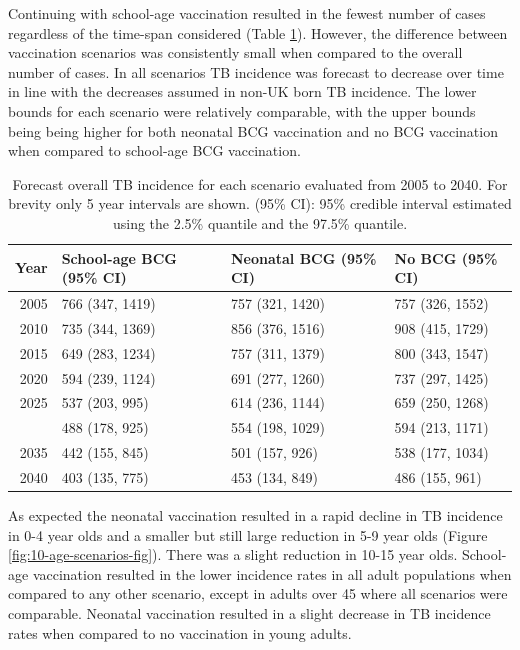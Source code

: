\documentclass[11pt,twoside]{bristolthesis}
\begin{document}
  Continuing with school-age vaccination resulted in the fewest number of cases regardless of the time-span considered (Table \ref{tab:10-table-future-incidence}). However, the difference between vaccination scenarios was consistently small when compared to the overall number of cases. In all scenarios TB incidence was forecast to decrease over time in line with the decreases assumed in non-UK born TB incidence. The lower bounds for each scenario were relatively comparable, with the upper bounds being being higher for both neonatal BCG vaccination and no BCG vaccination when compared to school-age BCG vaccination.
  \begin{longtable}{rlll}
  \caption[Forecast overall TB incidence for each scenario evaluated from 2005 to 2040.]{\label{tab:10-table-future-incidence}Forecast overall TB incidence for each scenario evaluated from 2005 to 2040. For brevity only 5 year intervals are shown. (95\% CI): 95\% credible interval estimated using the 2.5\% quantile and the 97.5\% quantile.}\\
  \toprule
  Year & School-age BCG (95\% CI) & Neonatal BCG (95\% CI) & No BCG (95\% CI)\\
  \midrule
  2005 & 766 (347, 1419) & 757 (321, 1420) & 757 (326, 1552)\\
  2010 & 735 (344, 1369) & 856 (376, 1516) & 908 (415, 1729)\\
  2015 & 649 (283, 1234) & 757 (311, 1379) & 800 (343, 1547)\\
  2020 & 594 (239, 1124) & 691 (277, 1260) & 737 (297, 1425)\\
  2025 & 537 (203, 995) & 614 (236, 1144) & 659 (250, 1268)\\
  \addlinespace
  2030 & 488 (178, 925) & 554 (198, 1029) & 594 (213, 1171)\\
  2035 & 442 (155, 845) & 501 (157, 926) & 538 (177, 1034)\\
  2040 & 403 (135, 775) & 453 (134, 849) & 486 (155, 961)\\
  \bottomrule
  \end{longtable}
  As expected the neonatal vaccination resulted in a rapid decline in TB incidence in 0-4 year olds and a smaller but still large reduction in 5-9 year olds (Figure \ref{fig:10-age-scenarios-fig}). There was a slight reduction in 10-15 year olds. School-age vaccination resulted in the lower incidence rates in all adult populations when compared to any other scenario, except in adults over 45 where all scenarios were comparable. Neonatal vaccination resulted in a slight decrease in TB incidence rates when compared to no vaccination in young adults.
\end{document}
